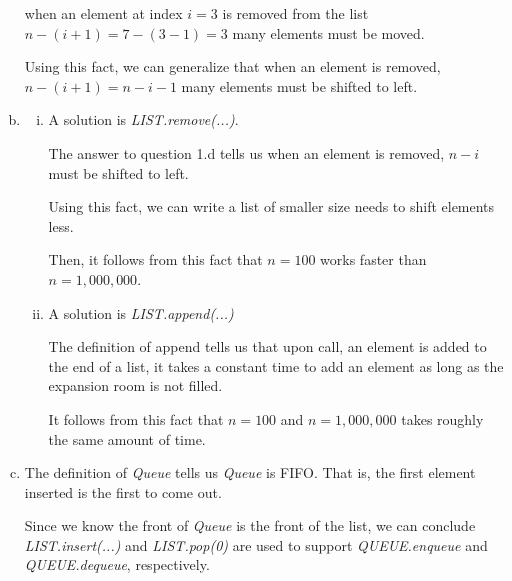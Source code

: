\documentclass[12pt]{article}
\begin{document}
\begin{enumerate}[a.]
\begin{mdframed}
        when an element at index $i = 3$ is removed from the list $n - (i+1) =
        7 - (3 - 1) = 3$ many elements must be moved.

        \bigskip

        Using this fact, we can generalize that when an element is removed,
        $n - (i+1) = n - i - 1$ many elements must be shifted to left.

        \color{black}

    \end{mdframed}

    \item

    \begin{enumerate}[i.]
        \item

        A solution is \textit{LIST.remove(...)}.

        \bigskip

        The answer to question 1.d tells us when an element is removed, $n-i$
        must be shifted to left.

        \bigskip

        Using this fact, we can write a list of smaller size needs to shift elements less.

        \bigskip

        Then, it follows from this fact that $n = 100$ works faster than $n = 1,000,000$.

        \item

        A solution is \textit{LIST.append(...)}

        \bigskip

        The definition of append tells us that upon call, an element is added to
        the end of a list, it takes a constant time to add an element
        as long as the expansion room is not filled.

        \bigskip

        It follows from this fact that $n = 100$ and $n = 1,000,000$ takes roughly
        the same amount of time.
    \end{enumerate}

    \item

    The definition of \textit{Queue} tells us \textit{Queue} is FIFO. That is,
    the first element inserted is the first to come out.

    \bigskip

    Since we know the front of \textit{Queue} is the front of the list, we
    can conclude \textit{LIST.insert(...)} and \textit{LIST.pop(0)} are used
    to support \textit{QUEUE.enqueue} and \textit{QUEUE.dequeue}, respectively.


\end{enumerate}
\end{document}
